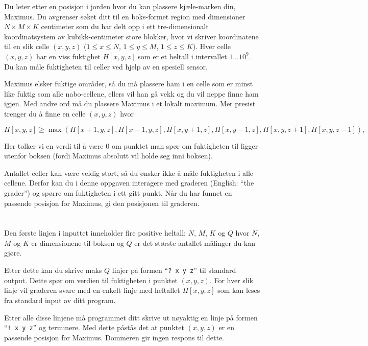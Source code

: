 \ifx\boi\undefined\fi
\def\version{jury-1}
Du leter etter en posisjon i jorden hvor du kan plassere kjæle-marken din, Maximus. Du avgrenser søket ditt til en boks-formet region med dimensioner $N \times M \times K$ centimeter som du har delt opp i ett tre-dimensionalt koordinatsystem av kubikk-centimeter store blokker, hvor vi skriver koordinatene til en slik celle $(x,y,z)$ ($1 \le x \le N$, $1 \le y \le M$, $1 \le z \le K$). Hver celle $(x,y,z)$ har en viss fuktighet $H[x,y,z]$ som er et heltall i intervallet $1 \dots 10^9$. Du kan måle fuktigheten til celler ved hjelp av en spesiell sensor.

Maximus elsker fuktige områder, så du må plassere ham i en celle som er minst like fuktig som alle nabo-cellene, ellers vil han gå vekk og du vil neppe finne ham igjen. Med andre ord må du plassere Maximus i et lokalt maximum. Mer presist trenger du å finne en celle $(x,y,z)$ hvor

$$
H[x,y,z] \ge \max(H[x+1,y,z], H[x-1,y,z], H[x,y+1,z], H[x,y-1,z], H[x,y,z+1], H[x,y,z-1]),
$$

Her tolker vi en verdi til å være 0 om punktet man spør om fuktigheten til ligger utenfor boksen (fordi Maximus absolutt vil holde seg inni boksen).

Antallet celler kan være veldig stort, så du ønsker ikke å måle fuktigheten i alle cellene. Derfor kan du i denne oppgaven interagere med graderen (English: ``the grader'') og spørre om fuktigheten i ett gitt punkt.
Når du har funnet en passende posisjon for Maximus, gi den posisjonen til graderen.

\section*{\interactivity}
Den første linjen i inputtet inneholder fire positive heltall: $N$, $M$, $K$ og $Q$ hvor $N$, $M$ og $K$ er dimensionene til boksen og $Q$ er det største antallet målinger du kan gjøre.

Etter dette kan du skrive maks $Q$ linjer på formen ``\texttt{?\ x y z}'' til standard output. Dette spør om verdien til fuktigheten i punktet $(x,y,z)$. For hver slik linje vil graderen svare med en enkelt linje med heltallet $H[x,y,z]$ som kan leses fra standard input av ditt program.

Etter alle disse linjene må programmet ditt skrive ut nøyaktig en linje på formen ``\texttt{!\ x y z}'' og terminere. Med dette påstås det at punktet $(x,y,z)$ er en passende posisjon for Maximus. Dommeren gir ingen respons til dette.

